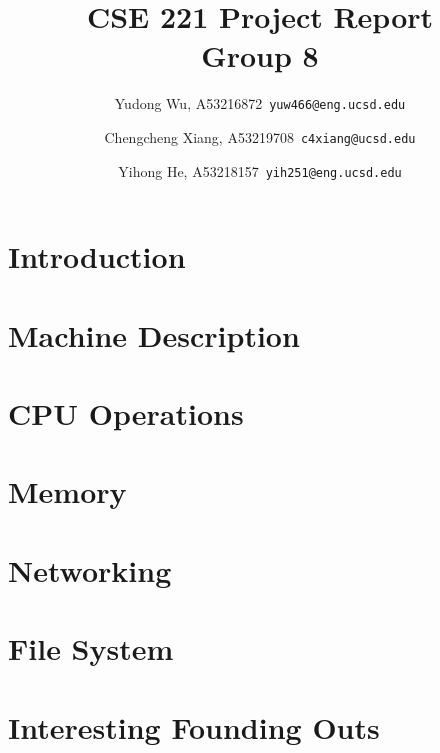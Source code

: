 \documentclass{article}
\begin{document}

\setlength{\parskip}{1em}


\title{CSE 221 Project Report \\
        \large Group 8}

\author{
        Yudong Wu, A53216872\ \texttt{yuw466@eng.ucsd.edu}
        \and
        Chengcheng Xiang, A53219708\ \texttt{c4xiang@ucsd.edu}
        \and
        Yihong He, A53218157\ \texttt{yih251@eng.ucsd.edu}
}

\maketitle

\lstset{
    numbers=left,
    numberstyle=\footnotesize,
    stepnumber=1,
    numbersep=5pt,
    basicstyle=\footnotesize,
    frame=single,
    tabsize=2,
    breaklines=true,
    xleftmargin=2em,
    xrightmargin=2em,
}

\section{Introduction}




\section{Machine Description}



\section{CPU Operations}


\section{Memory}


\section{Networking}


\section{File System}


\section{Interesting Founding Outs}



\printbibliography
\end{document}
